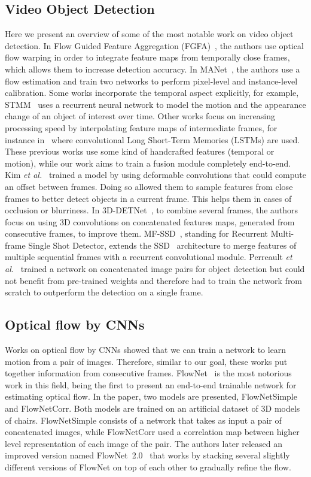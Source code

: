 \documentclass[runningheads]{llncs}
\newcommand{\etal}{\textit{et al.}}
\begin{document}
\subsection{Video Object Detection}
Here we present an overview of some of the most notable work on video object detection. In Flow Guided Feature Aggregation (FGFA)~\cite{zhu2017flow}, the authors use optical flow warping in order to integrate feature maps from temporally close frames, which allows them to increase detection accuracy. In MANet~\cite{wang2018fully}, the authors use a flow estimation and train two networks to perform pixel-level and instance-level calibration. Some works incorporate the temporal aspect explicitly, for example, STMM~\cite{xiao2018video} uses a recurrent neural network to model the motion and the appearance change of an object of interest over time. Other works focus on increasing processing speed by interpolating feature maps of intermediate frames, for instance in~\cite{Liu_2018_CVPR} where convolutional Long Short-Term Memories (LSTMs) are used. These previous works use some kind of handcrafted features (temporal or motion), while our work aims to train a fusion module completely end-to-end. Kim \etal~\cite{Bertasius_2018_ECCV} trained a model by using deformable convolutions that could compute an offset between frames. Doing so allowed them to sample features from close frames to better detect objects in a current frame. This helps them in cases of occlusion or blurriness. In 3D-DETNet~\cite{3D_detnet_li20183d}, to combine several frames, the authors focus on using 3D convolutions on concatenated features maps, generated from consecutive frames, to improve them. MF-SSD~\cite{broad2018recurrent_mf-ssd}, standing for Recurrent Multi-frame Single Shot Detector, extends the SSD~\cite{liu2016ssd} architecture to merge features of multiple sequential frames with a recurrent convolutional module. Perreault \etal~\cite{perreault2019road} trained a network on concatenated image pairs for object detection but could not benefit from pre-trained weights and therefore had to train the network from scratch to outperform the detection on a single frame. 

\subsection{Optical flow by CNNs} 
Works on optical flow by CNNs showed that we can train a network to learn motion from a pair of images. Therefore, similar to our goal, these works put together information from consecutive frames. FlowNet~\cite{flownet_Dosovitskiy_2015_ICCV} is the most notorious work in this field, being the first to present an end-to-end trainable network for estimating optical flow. In the paper, two models are presented, FlowNetSimple and FlowNetCorr. Both models are trained on an artificial dataset of 3D models of chairs. FlowNetSimple consists of a network that takes as input a pair of concatenated images, while FlowNetCorr used a correlation map between higher level representation of each image of the pair. The authors later released an improved version named FlowNet~2.0~\cite{flownet2_Ilg_2017_CVPR} that works by stacking several slightly different versions of FlowNet on top of each other to gradually refine the flow.
\end{document}
